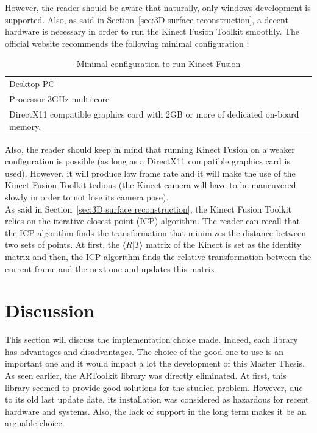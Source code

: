 However, the reader should be aware that naturally, only windows development is supported. Also, as said in Section~\ref{sec:3D surface reconstruction}, a decent hardware is necessary in order to run the Kinect Fusion Toolkit smoothly. The official website recommends the following minimal configuration \cite{kinect}:


\begin{table}[h]
\caption{Minimal configuration to run Kinect Fusion}
\begin{tabular}{l}
 Desktop PC \\
 Processor 3GHz multi-core\\
 DirectX11 compatible graphics card with 2GB or more of dedicated on-board memory.
\end{tabular}
\label{tab:kinectfusion-minimalconfiguration}
\end{table}

Also, the reader should keep in mind that running Kinect Fusion on a weaker configuration is possible (as long as a DirectX11 compatible graphics card is used). However, it will produce low frame rate and it will make the use of the Kinect Fusion Toolkit tedious (the Kinect camera will have to be maneuvered slowly in order to not lose its camera pose).\\

As said in Section~\ref{sec:3D surface reconstruction}, the Kinect Fusion Toolkit relies on the iterative closest point (ICP) algorithm. The reader can recall that the ICP algorithm finds the transformation that minimizes the distance between two sets of points. At first, the $\langle R\vert T\rangle$ matrix of the Kinect is set as the identity matrix and then, the ICP algorithm finds the relative transformation between the current frame and the next one and updates this matrix.\\

\section{Discussion}
This section will discuss the implementation choice made. Indeed, each library has advantages and disadvantages. The choice of the good one to use is an important one and it would impact a lot the development of this Master Thesis.\\ 

As seen earlier, the ARToolkit library was directly eliminated. At first, this library seemed to provide good solutions for the studied problem. However, due to its old last update date, its installation was considered as hazardous for recent hardware and systems. Also, the lack of support in the long term makes it be an arguable choice.\\

